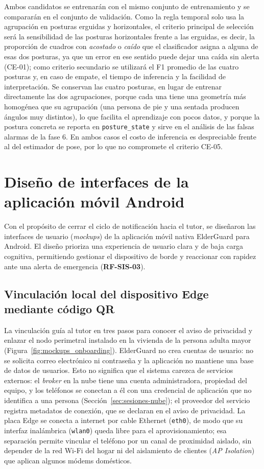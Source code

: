 \documentclass[12pt,a4paper,oneside]{book}
\theoremstyle{plain}
\theoremstyle{definition}
\theoremstyle{remark}
\begin{document}
Ambos candidatos se entrenarán con el mismo conjunto de entrenamiento y se compararán en el conjunto de validación. Como la regla temporal solo usa la agrupación en posturas erguidas y horizontales, el criterio principal de selección será la sensibilidad de las posturas horizontales frente a las erguidas, es decir, la proporción de cuadros con \textit{acostado} o \textit{caído} que el clasificador asigna a alguna de esas dos posturas, ya que un error en ese sentido puede dejar una caída sin alerta (CE-01); como criterio secundario se utilizará el F1 promedio de las cuatro posturas y, en caso de empate, el tiempo de inferencia y la facilidad de interpretación. Se conservan las cuatro posturas, en lugar de entrenar directamente las dos agrupaciones, porque cada una tiene una geometría más homogénea que su agrupación (una persona de pie y una sentada producen ángulos muy distintos), lo que facilita el aprendizaje con pocos datos, y porque la postura concreta se reporta en \texttt{posture\_state} y sirve en el análisis de las falsas alarmas de la fase 6. En ambos casos el costo de inferencia es despreciable frente al del estimador de pose, por lo que no compromete el criterio CE-05.

\section{Diseño de interfaces de la aplicación móvil Android}
\label{sec:mockups-app}

Con el propósito de cerrar el ciclo de notificación hacia el tutor, se diseñaron las interfaces de usuario (\textit{mockups}) de la aplicación móvil nativa ElderGuard para Android. El diseño prioriza una experiencia de usuario clara y de baja carga cognitiva, permitiendo gestionar el dispositivo de borde y reaccionar con rapidez ante una alerta de emergencia (\textbf{RF-SIS-03}).

\subsection{Vinculación local del dispositivo Edge mediante código QR}
La vinculación guía al tutor en tres pasos para conocer el aviso de privacidad y enlazar el nodo perimetral instalado en la vivienda de la persona adulta mayor (Figura~\ref{fig:mockups_onboarding}). ElderGuard no crea cuentas de usuario: no se solicita correo electrónico ni contraseña y la aplicación no mantiene una base de datos de usuarios. Esto no significa que el sistema carezca de servicios externos: el \textit{broker} en la nube tiene una cuenta administradora, propiedad del equipo, y los teléfonos se conectan a él con una credencial de aplicación que no identifica a una persona (Sección~\ref{sec:sesiones-nube}); el proveedor del servicio registra metadatos de conexión, que se declaran en el aviso de privacidad. La placa Edge se conecta a internet por cable Ethernet (\texttt{eth0}), de modo que su interfaz inalámbrica (\texttt{wlan0}) queda libre para el aprovisionamiento; esa separación permite vincular el teléfono por un canal de proximidad aislado, sin depender de la red Wi-Fi del hogar ni del aislamiento de clientes (\textit{AP Isolation}) que aplican algunos módems domésticos.
\end{document}
